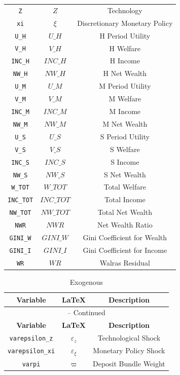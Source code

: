 \begin{center}
\begin{longtable}{ccc}
\texttt{Z} & $Z$ & Technology\\
\texttt{xi} & $\xi$ & Discretionary Monetary Policy\\
\texttt{U\_H} & $U\_H$ & H Period Utility\\
\texttt{V\_H} & $V\_H$ & H Welfare\\
\texttt{INC\_H} & $INC\_H$ & H Income\\
\texttt{NW\_H} & $NW\_H$ & H Net Wealth\\
\texttt{U\_M} & $U\_M$ & M Period Utility\\
\texttt{V\_M} & $V\_M$ & M Welfare\\
\texttt{INC\_M} & $INC\_M$ & M Income\\
\texttt{NW\_M} & $NW\_M$ & M Net Wealth\\
\texttt{U\_S} & $U\_S$ & S Period Utility\\
\texttt{V\_S} & $V\_S$ & S Welfare\\
\texttt{INC\_S} & $INC\_S$ & S Income\\
\texttt{NW\_S} & $NW\_S$ & S Net Wealth\\
\texttt{W\_TOT} & $W\_TOT$ & Total Welfare\\
\texttt{INC\_TOT} & $INC\_TOT$ & Total Income\\
\texttt{NW\_TOT} & $NW\_TOT$ & Total Net Wealth\\
\texttt{NWR} & $NWR$ & Net Wealth Ratio\\
\texttt{GINI\_W} & $GINI\_W$ & Gini Coefficient for Wealth\\
\texttt{GINI\_I} & $GINI\_I$ & Gini Coefficient for Income\\
\texttt{WR} & $WR$ & Walras Residual\\
\hline%
\end{longtable}
\end{center}
\begin{center}
\begin{longtable}{ccc}
\caption{Exogenous}\\%
\hline%
\multicolumn{1}{c}{\textbf{Variable}} &
\multicolumn{1}{c}{\textbf{\LaTeX}} &
\multicolumn{1}{c}{\textbf{Description}}\\%
\hline\hline%
\endfirsthead
\multicolumn{3}{c}{{\tablename} \thetable{} -- Continued}\\%
\hline%
\multicolumn{1}{c}{\textbf{Variable}} &
\multicolumn{1}{c}{\textbf{\LaTeX}} &
\multicolumn{1}{c}{\textbf{Description}}\\%
\hline\hline%
\endhead
\texttt{varepsilon\_z} & $\varepsilon_z$ & Technological Shock\\
\texttt{varepsilon\_xi} & $\varepsilon_\xi$ & Monetary Policy Shock\\
\texttt{varpi} & $\varpi$ & Deposit Bundle Weight\\
\hline%
\end{longtable}
\end{center}
